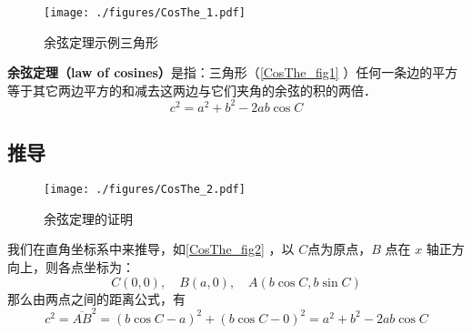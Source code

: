 
\begin{figure}[ht]
\centering
\texttt{[image: ./figures/CosThe\_1.pdf]}
\caption{余弦定理示例三角形} \label{CosThe_fig1}
\end{figure}
\textbf{余弦定理（law of cosines）}是指：三角形（\autoref{CosThe_fig1} ）任何一条边的平方等于其它两边平方的和减去这两边与它们夹角的余弦的积的两倍．
\begin{equation}\label{CosThe_eq1}
c^2=a^2 + b^2 - 2ab\cos C
\end{equation}


\subsection{推导}
\begin{figure}[ht]
\centering
\texttt{[image: ./figures/CosThe\_2.pdf]}
\caption{余弦定理的证明} \label{CosThe_fig2}
\end{figure}
我们在直角坐标系中来推导，如\autoref{CosThe_fig2} ，以 $C$点为原点，$B$ 点在 $x$ 轴正方向上，则各点坐标为：
\begin{equation}
C(0,0),\quad B(a,0),\quad A(b\cos C,b\sin C)
\end{equation}
那么由两点之间的距离公式，有
\begin{equation}
c^2=\overline{AB}^2=(b\cos C-a)^2+(b\cos C-0)^2=a^2+b^2-2ab\cos C
\end{equation}

